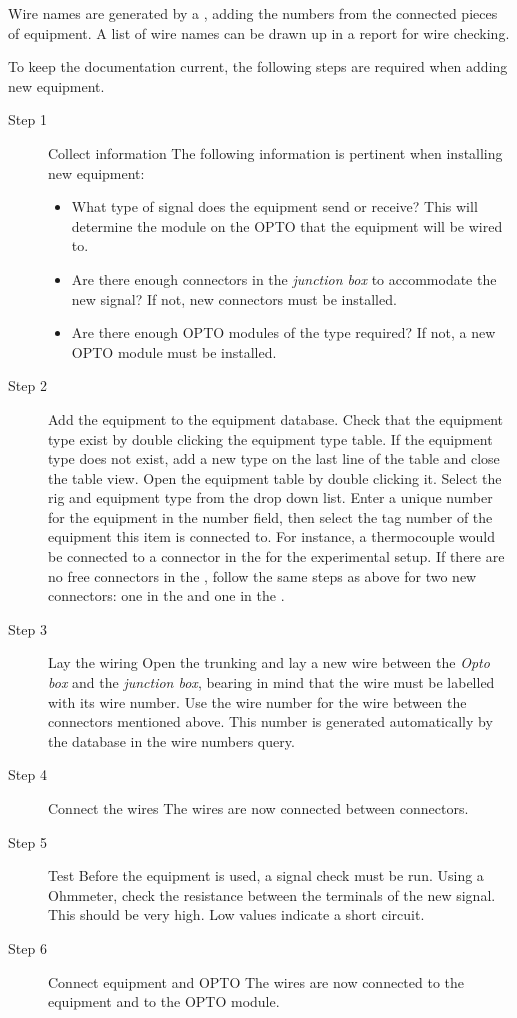 Wire names are generated by a , adding the numbers from the connected pieces of equipment.  A list of wire names can be drawn up in a report for wire checking. 

To keep the documentation current, the following steps are required when adding new equipment.
\begin{description}
\item[Step 1] Collect information
The following information is pertinent when installing new equipment:
\begin{itemize}
	\item	What type of signal does the equipment send or receive?  This will determine the module on the OPTO that the equipment will be wired to.
	\item	Are there enough connectors in the \emph{junction box} to accommodate the new signal?  If not, new connectors must be installed.
	\item	Are there enough OPTO modules of the type required? If not, a new OPTO module must be installed.
\end{itemize}

\item[Step 2] Add the equipment to the equipment database.
Check that the equipment type exist by double clicking the equipment type table.  If the equipment type does not exist, add a new type on the last line of the table and close the table view.  Open the equipment table by double clicking it.  Select the rig and equipment type from the drop down list.  Enter a unique number for the equipment in the number field, then select the tag number of the equipment this item is connected to.  For instance, a thermocouple would be connected to a connector in the  for the experimental setup. If there are no free connectors in the , follow the same steps as above for two new connectors: one in the  and one in the .

\item[Step 3] Lay the wiring
Open the trunking and lay a new wire between the \emph{Opto box} and the \emph{junction box}, bearing in mind that the wire must be labelled with its wire number.  Use the wire number for the wire between the connectors mentioned above.  This number is generated automatically by the database in the wire numbers query.

\item[Step 4] Connect the wires
The wires are now connected between connectors.

\item[Step 5] Test
Before the equipment is used, a signal check must be run.  Using a Ohmmeter, check the resistance between the terminals of the new signal.  This should be very high.  Low values indicate a short circuit.

\item[Step 6] Connect equipment and OPTO
The wires are now connected to the equipment and to the OPTO module.
\end{description}

